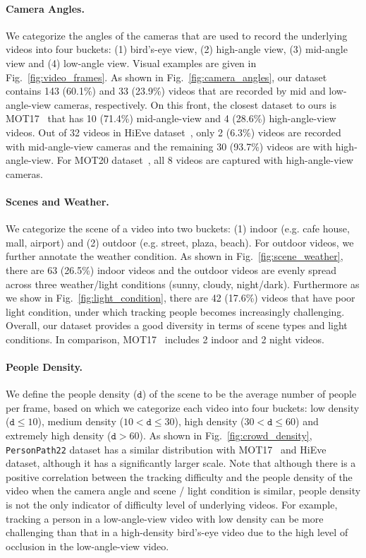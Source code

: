 \documentclass[runningheads]{llncs}
\begin{document}
\paragraph{\textbf{Camera Angles.}} We categorize the angles of the cameras that are used to record the underlying videos into four buckets: (1) bird's-eye view, (2) high-angle view, (3) mid-angle view and (4) low-angle view. Visual examples are given in Fig.~\ref{fig:video_frames}.
As shown in Fig.~\ref{fig:camera_angles}, our dataset contains 143 (60.1\%) and 33 (23.9\%) videos that are recorded by mid and low-angle-view cameras, respectively. On this front, the closest dataset to ours is MOT17~\cite{mot} that has 10 (71.4\%) mid-angle-view and 4 (28.6\%) high-angle-view videos. Out of 32 videos in HiEve dataset~\cite{hieve}, only 2 (6.3\%) videos are recorded with mid-angle-view cameras and the remaining 30 (93.7\%) videos are with high-angle-view. For MOT20 dataset~\cite{mot20}, all 8 videos are captured with high-angle-view cameras.

\paragraph{\textbf{Scenes and Weather.}} We categorize the scene of a video into two buckets: (1) indoor (e.g. cafe house, mall, airport) and (2) outdoor (e.g. street, plaza, beach). For outdoor videos, we further annotate the weather condition. As shown in Fig.~\ref{fig:scene_weather}, there are 63 (26.5\%) indoor videos and the outdoor videos are evenly spread across three weather/light conditions (sunny, cloudy, night/dark). Furthermore as we show in Fig.~\ref{fig:light_condition}, there are 42 (17.6\%) videos that have poor light condition, under which tracking people becomes increasingly challenging. Overall, our dataset provides a good diversity in terms of scene types and light conditions.  In comparison, MOT17~\cite{mot} includes 2 indoor and 2 night videos.


\paragraph{\textbf{People Density.}} We define the people density ($\mathtt{d}$) of the scene to be the average number of people per frame, based on which we categorize each video into four buckets: low density ($\mathtt{d} \leq 10$), medium density ($10 < \mathtt{d} \leq 30$), high density ($30 < \mathtt{d} \leq 60$) and extremely high density ($\mathtt{d} > 60$). As shown in Fig.~\ref{fig:crowd_density}, \texttt{PersonPath22} dataset has a similar distribution with MOT17~\cite{mot} and HiEve~\cite{hieve} dataset, although it has a significantly larger scale.
Note that although there is a positive correlation between the tracking difficulty and the people density of the video when the camera angle and scene / light condition is similar, people density is not the only indicator of difficulty level of underlying videos. For example, tracking a person in a low-angle-view video with low density can be more challenging than that in a high-density bird's-eye video due to the high level of occlusion in the low-angle-view video.
\end{document}
